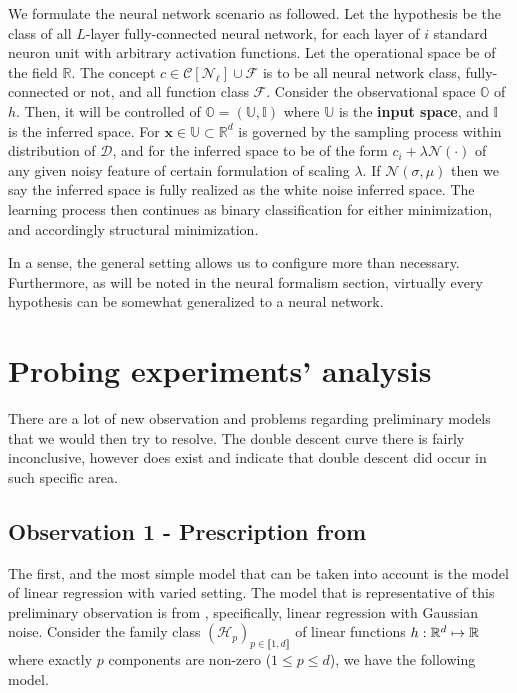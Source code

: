\documentclass[10pt,oneside,oldfontcommands,dvipsnames,article]{memoir}
\begin{document}
\begin{setting}
    We formulate the neural network scenario as followed. Let the hypothesis be the class of all $L$-layer fully-connected neural network, for each layer of $i$ standard neuron unit with arbitrary activation functions. Let the operational space be of the field $\mathbb{R}$. The concept $c\in \mathcal{C}[\mathcal{N}_{\ell}]\cup \mathcal{F}$ is to be all neural network class, fully-connected or not, and all function class $\mathcal{F}$. Consider the observational space $\mathbb{O}$ of $h$. Then, it will be controlled of $\mathbb{O}=(\mathbb{U},\mathbb{I})$ where $\mathbb{U}$ is the \textbf{input space}, and $\mathbb{I}$ is the inferred space. For $\mathbf{x}\in \mathbb{U}\subset \mathbb{R}^{d}$ is governed by the sampling process within distribution of $\mathcal{D}$, and for the inferred space to be of the form $c_{i}+\lambda\mathcal{N}(\cdot)$ of any given noisy feature of certain formulation of scaling $\lambda$. If $\mathcal{N}(\sigma, \mu)$ then we say the inferred space is fully realized as the white noise inferred space. The learning process then continues as binary classification for either minimization, and accordingly structural minimization. 
\end{setting}
In a sense, the general setting allows us to configure more than necessary. Furthermore, as will be noted in the neural formalism section, virtually every hypothesis can be somewhat generalized to a neural network. 

\clearpage
\section{Probing experiments' analysis}
There are a lot of new observation and problems regarding preliminary models that we would then try to resolve. The double descent curve there is fairly inconclusive, however does exist and indicate that double descent did occur in such specific area. 
\subsection{Observation 1 - Prescription from \cite{10.5555/2621980}}
The first, and the most simple model that can be taken into account is the model of linear regression with varied setting. The model that is representative of this preliminary observation is from \cite{lafon_understanding_2024}, specifically, linear regression with Gaussian noise. Consider the family class $(\mathcal{H}_p)_{p\in\llbracket1,d\rrbracket}$ of linear functions $h:\mathbb{R}^d\mapsto \mathbb{R}$ where exactly $p$ components are non-zero ($1\leq p\leq d$), we have the following model. 
\end{document}
